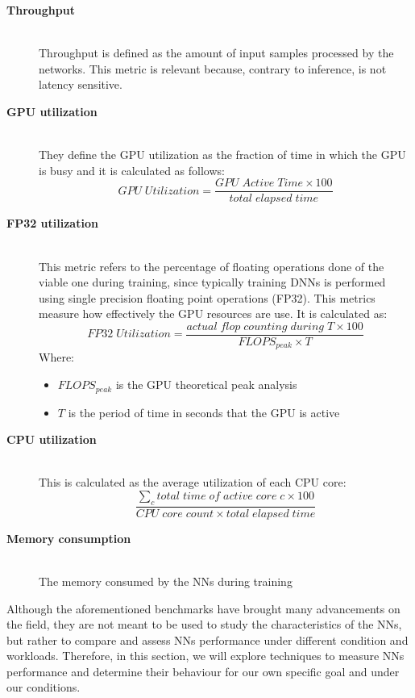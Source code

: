 \begin{description}
  \item[\textbf{Throughput}] \hfill\\ Throughput is defined as the amount of input samples processed by the networks. This metric is relevant because, contrary to inference, is not latency sensitive.   
  \item[\textbf{GPU utilization}] \hfill \\ They define the GPU utilization as the fraction of time in which the GPU is busy and it is calculated as follows:
  \begin{equation}
      GPU\;Utilization = \dfrac{GPU\;Active\;Time\times100}{total\;elapsed\;time}%
  \end{equation}
  
  \item[\textbf{FP32 utilization}] \hfill \\ This metric refers to the percentage of floating operations done of the viable one during training, since typically training DNNs is performed using single precision floating point operations (FP32). This metrics measure how effectively the GPU resources are use. It is calculated as:
  \begin{equation}
      FP32\;Utilization = \dfrac{actual\;flop\;counting\;during\;T\times100}{FLOPS_{peak} \times T}%
  \end{equation}
  Where:
  \begin{itemize}
  \item $FLOPS_{peak}$ is the GPU theoretical peak analysis
  \item $T$ is the period of time in seconds that the GPU is active
  \end{itemize}
  \item[\textbf{CPU utilization }] \hfill\\ This is calculated as the average utilization of each CPU core:
  \begin{equation}
      \dfrac{\sum_{c} total\;time\;of\;active\;core\;c \times 100}{CPU\;core\;count \times total\;elapsed\;time}%
    \end{equation}   
    \item[\textbf{Memory consumption }] \hfill\\ The memory consumed by the NNs during training
\end{description}
Although the aforementioned benchmarks have brought many advancements on the field, they are not meant to be used to study the characteristics of the NNs, but rather to compare and assess NNs performance under different condition and workloads. Therefore, in this section, we will explore techniques to measure NNs performance and determine their behaviour for our own specific goal and under our conditions.  


